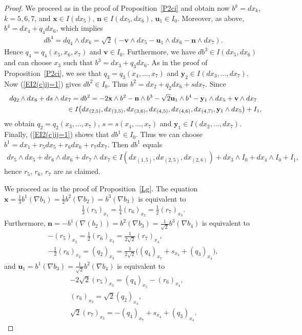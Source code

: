 \documentclass[11pt]{article}
\numberwithin{equation}{section}
\newcommand\bx{{\mathbf x}}
\newcommand\bu{{\mathbf u}}
\newcommand\by{{\mathbf y}}
\newcommand\bn{{\mathbf n}}
\newcommand\bv{{\mathbf v}}
\begin{document}
\begin{proof} We proceed as in the proof of Proposition~\ref{P2ci} and obtain now $b^k=dx_k$, $k=5,6,7$, and $\bx\in I(dx_5)$, $\bn\in I(dx_5,dx_6)$, $\bu_1\in I_0$. Moreover, as above, $b^4=dx_4+q_4 dx_6$, which implies
\begin{gather*}db^4=dq_4\wedge dx_6=\sqrt2 (-\bv\wedge dx_5-\bu_1\wedge dx_6 -\bn\wedge dx_7).\end{gather*}
Hence $q_4=q_4(x_5,x_6,x_7)$ and $\bv\in I_0$. Furthermore, we have $db^3\in I(dx_5,dx_6)$ and can choose $x_3$ such that $b^3=dx_3+q_3dx_6$. As in the proof of Proposition~\ref{P2ci}, we see that $q_3=q_3(x_4,\dots,x_7)$ and $\by_2\in I(dx_3,\dots,dx_7)$. Now (\ref{EI2(c)ij=1}) gives $db^2\in I_0$. Thus $b^2=dx_2+q_2dx_6+sdx_7$. Since
\begin{gather*}
dq_2\wedge dx_6+ds\wedge dx_7 = db^2=-2\bx\wedge b^2 -\bn\wedge b^3-\sqrt2 \bu_1\wedge b^4-\by_1\wedge dx_5+\bv\wedge dx_7\\
\hphantom{dq_2\wedge dx_6+ds\wedge dx_7}{} \in I\big(dx_{(2,5)}, dx_{(3,5)}, dx_{(3,6)}, dx_{(4,5)}, dx_{(4,6)},dx_{(4,7)}, \by_1\wedge dx_5\big)+I_1,
\end{gather*}
we obtain $q_2=q_2(x_3,\dots,x_7)$, $s=s(x_4,\dots,x_7)$ and $\by_1\in I(dx_2,\dots,dx_7)$. Finally, (\ref{EI2(c)ij=1}) shows that $db^1\in I_0$. Thus we can choose $b^1=dx_1+ r_5dx_5+r_6dx_6+r_7dx_7$. Then $db^1$ equals
\begin{gather*}
dr_5\wedge dx_5+dr_6\wedge dx_6+dr_7\wedge dx_7\in I( dx_{(1,5)}, dx_{(2,5)}, dx_{(2,6)})+ dx_3\wedge I_0 +dx_4\wedge I_0+I_1,
\end{gather*}
hence $r_5$, $r_6$, $r_7$ are as claimed.

We proceed as in the proof of Proposition~\ref{Lg}. The equation $\bx=\frac13 b^1(\nabla b_1)=\frac12 b^2(\nabla b_2)=b^3(\nabla b_3)$ is equivalent to
\begin{gather}
\tfrac13(r_5)_{x_1} = \tfrac14(r_6)_{x_2} =\tfrac12 (r_7)_{x_3}.\label{ED1b}
\end{gather}
Furthermore, $\bn=-b^1(\nabla(b_2))=b^2(\nabla b_3)=\frac1{\sqrt 2} b^3(\nabla b_4)$ is equivalent to
\begin{gather}
 -(r_5)_{x_2} =\tfrac12 (r_6)_{x_3}=\tfrac1{2\sqrt 2} (r_7)_{x_4},\label{ED2b}\\
- \tfrac12 (r_6)_{x_2} =(q_2)_{x_3} =\tfrac1{2\sqrt 2}\big((q_4)_{x_7}+s_{x_4}+(q_3)_{x_4}\big), \label{E60}
\end{gather}
and $\bu_1= b^1(\nabla b_3) =\frac 1{\sqrt2}b^2(\nabla b_4 )$ is equivalent to
\begin{gather}
 -2\sqrt2 (r_5)_{x_3}=(q_4)_{x_5} -(r_6)_{x_4},\label{E61}\\
 (r_6)_{x_3}=\sqrt2 (q_2)_{x_4}, \label{E62}\\
 \sqrt2(r_7)_{x_3}= -(q_4)_{x_7} +s_{x_4}+(q_3)_{x_4} . \label{ED3b}
 \end{gather}


\end{proof}
\end{document}
